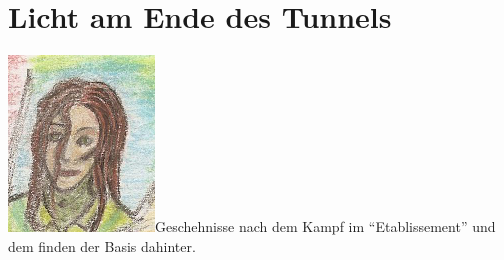 \documentclass[11pt]{scrartcl}
\begin{document}
\section{Licht am Ende des Tunnels}

\includegraphics{sskreszta-portrait-alt-klein.png}Geschehnisse
nach dem Kampf im ``Etablissement'' und dem finden der Basis dahinter.
\end{document}
